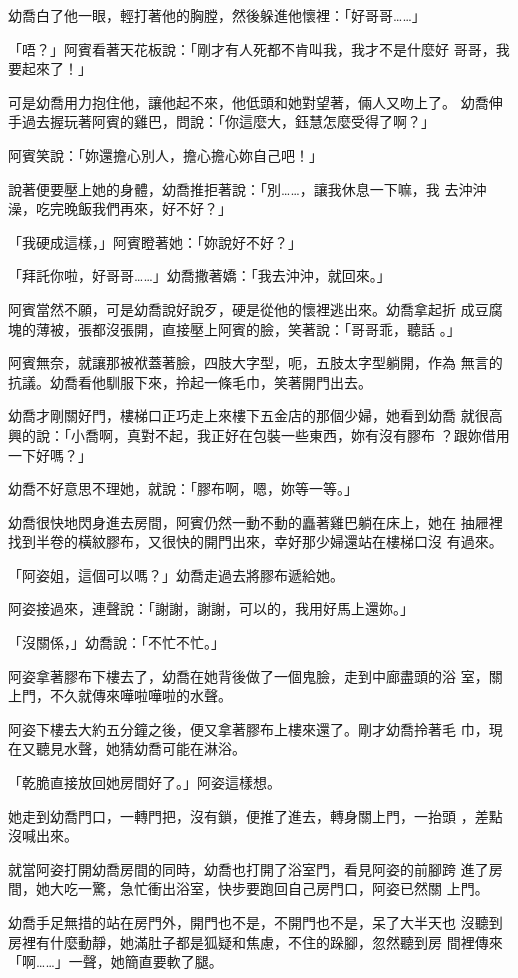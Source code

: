 幼喬白了他一眼，輕打著他的胸膛，然後躲進他懷裡：「好哥哥……」

「唔？」阿賓看著天花板說：「剛才有人死都不肯叫我，我才不是什麼好
哥哥，我要起來了！」

可是幼喬用力抱住他，讓他起不來，他低頭和她對望著，倆人又吻上了。
幼喬伸手過去握玩著阿賓的雞巴，問說：「你這麼大，鈺慧怎麼受得了啊？」

阿賓笑說：「妳還擔心別人，擔心擔心妳自己吧！」

說著便要壓上她的身體，幼喬推拒著說：「別……，讓我休息一下嘛，我
去沖沖澡，吃完晚飯我們再來，好不好？」

「我硬成這樣，」阿賓瞪著她：「妳說好不好？」

「拜託你啦，好哥哥……」幼喬撒著嬌：「我去沖沖，就回來。」

阿賓當然不願，可是幼喬說好說歹，硬是從他的懷裡逃出來。幼喬拿起折
成豆腐塊的薄被，張都沒張開，直接壓上阿賓的臉，笑著說：「哥哥乖，聽話
。」

阿賓無奈，就讓那被袱蓋著臉，四肢大字型，呃，五肢太字型躺開，作為
無言的抗議。幼喬看他馴服下來，拎起一條毛巾，笑著開門出去。

幼喬才剛關好門，樓梯口正巧走上來樓下五金店的那個少婦，她看到幼喬
就很高興的說：「小喬啊，真對不起，我正好在包裝一些東西，妳有沒有膠布
？跟妳借用一下好嗎？」

幼喬不好意思不理她，就說：「膠布啊，嗯，妳等一等。」

幼喬很快地閃身進去房間，阿賓仍然一動不動的矗著雞巴躺在床上，她在
抽屜裡找到半卷的橫紋膠布，又很快的開門出來，幸好那少婦還站在樓梯口沒
有過來。

「阿姿姐，這個可以嗎？」幼喬走過去將膠布遞給她。

阿姿接過來，連聲說：「謝謝，謝謝，可以的，我用好馬上還妳。」

「沒關係，」幼喬說：「不忙不忙。」

阿姿拿著膠布下樓去了，幼喬在她背後做了一個鬼臉，走到中廊盡頭的浴
室，關上門，不久就傳來嘩啦嘩啦的水聲。

阿姿下樓去大約五分鐘之後，便又拿著膠布上樓來還了。剛才幼喬拎著毛
巾，現在又聽見水聲，她猜幼喬可能在淋浴。

「乾脆直接放回她房間好了。」阿姿這樣想。

她走到幼喬門口，一轉門把，沒有鎖，便推了進去，轉身關上門，一抬頭
，差點沒喊出來。

就當阿姿打開幼喬房間的同時，幼喬也打開了浴室門，看見阿姿的前腳跨
進了房間，她大吃一驚，急忙衝出浴室，快步要跑回自己房門口，阿姿已然關
上門。

幼喬手足無措的站在房門外，開門也不是，不開門也不是，呆了大半天也
沒聽到房裡有什麼動靜，她滿肚子都是狐疑和焦慮，不住的跺腳，忽然聽到房
間裡傳來「啊……」一聲，她簡直要軟了腿。


